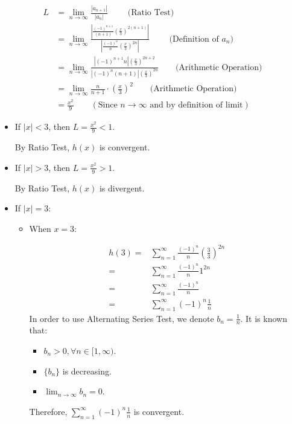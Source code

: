 \documentclass[12pt]{exam}
\begin{document}
\begin{enumerate}
\begin{align*}
	L &= \lim_{n \to \infty} \frac{|a_{n + 1}|}{|a_n|} \qquad\mbox{ (Ratio Test) } \\
	&= \lim_{n \to \infty} \frac{|\frac{(-1)^{n+1}}{(n+1)}(\frac{x}{3})^{2(n+1)}|}{|\frac{(-1)^n}{n}(\frac{x}{3})^{2n}|} \qquad\mbox{ (Definition of } a_n ) \\
	&= \lim_{n \to \infty} \frac{|(-1)^{n+1}n|(\frac{x}{3})^{2n+2}}{|(-1)^n(n+1)|(\frac{x}{3})^{2n}} \qquad\mbox{(Arithmetic Operation)} \\
	&= \lim_{n \to \infty} \frac{n}{n+1}\cdot (\frac{x}{3})^2 \qquad\mbox{(Arithmetic Operation)} \\
	&= \frac{x^2}{9} \qquad( \mbox{Since } n \to \infty \mbox{ and by definition of limit})
\end{align*}

\begin{itemize}
	\item If $|x| < 3$, then $L = \frac{x^2}{9} < 1$.

	By Ratio Test, $h(x)$ is convergent.

	\item If $|x| > 3$, then $L = \frac{x^2}{9} > 1$.

	By Ratio Test, $h(x)$ is divergent.

	\item If $|x| = 3$:

	\begin{itemize}
		\item When $x = 3$:

		\begin{align*}
			h(3)
			=& \sum_{n = 1}^{\infty} \frac{(-1)^n}{n}({\frac{3}{3}})^{2n}\\
			=& \sum_{n = 1}^{\infty} \frac{(-1)^n}{n}1^{2n} \\
			=& \sum_{n = 1}^{\infty} \frac{(-1)^n}{n} \\
			=& \sum_{n = 1}^{\infty} (-1)^n\frac{1}{n}
		\end{align*}
		In order to use Alternating Series Test, we denote $b_n = \frac{1}{n}$. It is known that:
		\begin{itemize}
			\item $b_n > 0, \forall n\in[1, \infty)$.
			\item $\{b_n\}$ is decreasing.
			\item $\lim_{n \to \infty} b_n = 0$.
		\end{itemize}
		
		Therefore, $\sum_{n = 1}^{\infty} (-1)^n \frac{1}{n}$ is convergent.
		

\end{itemize}
\end{itemize}
\end{enumerate}
\end{document}
